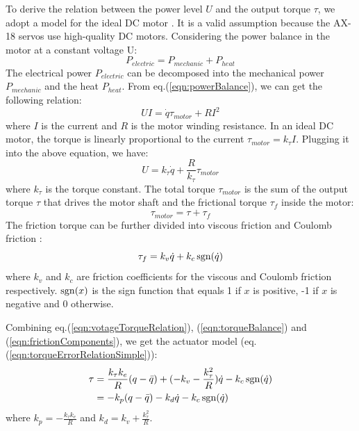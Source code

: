 To derive the relation between the power level $U$ and the output torque $\tau$, we adopt a model for the ideal DC motor \cite{SchwarzB:2013}. It is a valid assumption because the AX-18 servos use high-quality DC motors. Considering the power balance in the motor at a constant voltage U:
\begin{equation}
  P_{electric} = P_{mechanic} + P_{heat}
  \label{eqn:powerBalance}
\end{equation}
The electrical power $P_{electric}$ can be decomposed into the mechanical power $P_{mechanic}$ and the heat $P_{heat}$. From eq.(\ref{eqn:powerBalance}), we can get the following relation:
\begin{equation}
UI=\dot{q}\tau_{motor} + RI^2
\end{equation}
where $I$ is the current and $R$ is the motor winding resistance. In an ideal DC motor, the torque is linearly proportional to the current $\tau_{motor}=k_{\tau}I$. Plugging it into the above equation, we have:
\begin{equation}
  U=k_{\tau}\dot{q}+\frac{R}{k_{\tau}}\tau_{motor}
  \label{eqn:votageTorqueRelation}
\end{equation}
where $k_{\tau}$ is the torque constant. The total torque $\tau_{motor}$ is the sum of the output torque $\tau$ that drives the motor shaft and the frictional torque $\tau_f$ inside the motor:
\begin{equation}
  \tau_{motor}=\tau+\tau_f
  \label{eqn:torqueBalance}
\end{equation}
The friction torque can be further divided into viscous friction and Coulomb friction \cite{SchwarzB:2013}:
\begin{equation}
  \tau_f = k_v\dot{q}+k_c\operatorname{sgn}(\dot{q})
  \label{eqn:frictionComponents}
\end{equation}
where $k_v$ and $k_c$ are friction coefficients for the viscous and Coulomb friction respectively. $\operatorname{sgn}(x)$ is the sign function that equals 1 if $x$ is positive, -1 if $x$ is negative and 0 otherwise.

Combining eq.(\ref{eqn:votageTorqueRelation}), (\ref{eqn:torqueBalance}) and (\ref{eqn:frictionComponents}), we get the actuator model (eq.(\ref{eqn:torqueErrorRelationSimple})):
\begin{align}
\nonumber  \tau & = \frac{k_{\tau}k_e}{R}(q-\bar{q})+(-k_v-\frac{k_{\tau}^2}{R})\dot{q}-k_c\operatorname{sgn}(\dot{q})\\
\nonumber & = -k_p(q-\bar{q}) - k_d\dot{q} - k_c\operatorname{sgn}(\dot{q})
\end{align}
where $k_p=-\frac{k_{\tau}k_e}{R}$ and $k_d=k_v+\frac{k_{\tau}^2}{R}$. 
